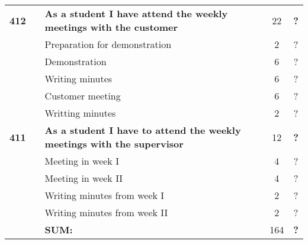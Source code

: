 \begin{longtable}{ccXcc}
\textbf{412} 	& 
	& {\bf As a student I have attend the weekly meetings with the customer} 	
	& 	22	
	& \textbf{?} \\
		&& Preparation for demonstration	& 2 & ? \\
		&& Demonstration	& 6 & ? \\
		&& Writing minutes 	&  6 & ? \\	
		&& Customer meeting	&  6 & ? \\
		&& Writting minutes	&  2 & ? \\
		
\textbf{411} 	& 
	& {\bf As a student I have to attend the weekly meetings with the supervisor} 	
	& 	12	
	& \textbf{?} \\
		&& Meeting in week I	& 4 & ? \\
		&& Meeting in week II	& 4 & ? \\
		&& Writing minutes from week I 	&  2 & ? \\
		&& Writing minutes from week II	&  2 & ? \\	
		
\midrule
		
				&& \textbf{SUM:}		&		164	& \textbf{?}
 \\																			
\bottomrule[1mm]
\end{longtable}
